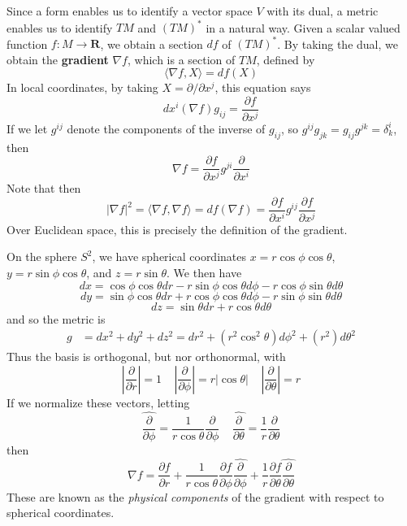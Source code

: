 Since a form enables us to identify a vector space $V$ with its dual, a metric enables us to identify $TM$ and $(TM)^*$ in a natural way. Given a scalar valued function $f: M \to \mathbf{R}$, we obtain a section $df$ of $(TM)^*$. By taking the dual, we obtain the {\bf gradient} $\nabla f$, which is a section of $TM$, defined by
%
\[ \langle \nabla f, X \rangle = df(X) \]
%
In local coordinates, by taking $X = \partial/\partial x^j$, this equation says
%
\[ dx^i(\nabla f) g_{ij} = \frac{\partial f}{\partial x^j} \]
%
If we let $g^{ij}$ denote the components of the inverse of $g_{ij}$, so $g^{ij} g_{jk} = g_{ij} g^{jk} = \delta^i_k$,  then
%
\[ \nabla f = \frac{\partial f}{\partial x^j} g^{ji} \frac{\partial}{\partial x^i} \]
%
Note that then
%
\[ |\nabla f|^2 = \langle \nabla f, \nabla f \rangle = df(\nabla f) = \frac{\partial f}{\partial x^i} g^{ij} \frac{\partial f}{\partial x^j} \]
%
Over Euclidean space, this is precisely the definition of the gradient.

\begin{example}
    On the sphere $S^2$, we have spherical coordinates $x = r \cos \phi \cos \theta$, $y = r \sin \phi \cos \theta$, and $z = r \sin \theta$. We then have
    \[ dx = \cos \phi \cos \theta dr - r \sin \phi \cos \theta d \phi - r \cos \phi \sin \theta d\theta \]
    \[ dy = \sin \phi \cos \theta dr + r \cos \phi \cos \theta d \phi - r \sin \phi \sin \theta d \theta \]
    \[ dz = \sin \theta dr + r \cos \theta d \theta \]
    and so the metric is
    \begin{align*}
        g &= dx^2 + dy^2 + dz^2 = dr^2 + (r^2 \cos^2 \theta) d\phi^2 + (r^2) d\theta^2
    \end{align*}
    Thus the basis is orthogonal, but nor orthonormal, with
    \[ \left|\frac{\partial}{\partial r} \right| = 1\ \ \ \ \ \left|\frac{\partial}{\partial \phi}\right| = r |\cos \theta|\ \ \ \ \ \left|\frac{\partial}{\partial \theta}\right| = r \]
    If we normalize these vectors, letting
    \[ \widehat{\frac{\partial}{\partial \phi}} = \frac{1}{r \cos \theta} \frac{\partial}{\partial \phi}\ \ \ \ \ \widehat{\frac{\partial}{\partial \theta}} = \frac{1}{r} \frac{\partial}{\partial \theta} \]
    then
    \[ \nabla f = \frac{\partial f}{\partial r} + \frac{1}{r \cos \theta} \frac{\partial f}{\partial \phi} \widehat{\frac{\partial}{\partial \phi}} + \frac{1}{r} \frac{\partial f}{\partial \theta} \widehat{\frac{\partial}{\partial \theta}} \]
    These are known as the {\it physical components} of the gradient with respect to spherical coordinates.
\end{example}

